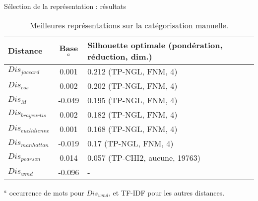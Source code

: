 \begin{frame}{Sélection de la représentation : résultats}
\begin{table}[!htb]
	\scriptsize
	\begin{center}
		\begin{tabular}[pos]{|l|c|p{}|}
			\hline
			\textbf{Distance}&\textbf{Base$^a$}&\textbf{Silhouette optimale   (pondération, réduction, dim.)} \\ \hline
			$Dis_{jaccard}$ & 0.001 & 0.212 (TP-NGL, FNM, 4) \\ \hline
			$Dis_{cos}$ & 0.002 & 0.202 (TP-NGL, FNM, 4) \\ \hline
			$Dis_{M}$ & -0.049 & 0.195 (TP-NGL, FNM, 4) \\ \hline
			$Dis_{braycurtis}$ & 0.002& 0.182 (TP-NGL, FNM, 4) \\ \hline
			$Dis_{euclidienne}$ & 0.001& 0.168  (TP-NGL, FNM, 4) \\ \hline
			$Dis_{manhattan}$ & -0.019& 0.17   (TP-NGL, FNM, 4) \\ \hline
			$Dis_{pearson}$ & 0.014 & 0.057 (TP-CHI2, aucune, 19763) \\ \hline
			$Dis_{wmd}$ & -0.096 &  - \\ \hline
		\end{tabular}				
	\end{center}
	
	$^a$ occurrence de mots pour $Dis_{wmd}$, et TF-IDF pour les autres distances.
	\caption{Meilleures représentations sur la catégorisation manuelle.} \label{tab:similarite:silhouette-vecteur-manuel}
\end{table}
\end{frame}

